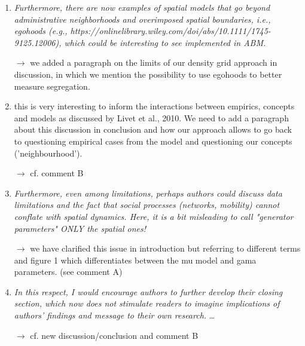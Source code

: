 \documentclass[11pt,a4paper,sans]{moderncv}        %
\begin{document}
\begin{enumerate}
  \medskip

  \item \textit{Furthermore, there are now examples of spatial models that go beyond administrative neighborhoods and overimposed spatial boundaries, i.e., egohoods (e.g., https://onlinelibrary.wiley.com/doi/abs/10.1111/1745-9125.12006), which could be interesting to see implemented in ABM.}
  
  $\rightarrow$ we added a paragraph on the limits of our density grid approach in discussion, in which we mention the possibility to use egohoods to better measure segregation.
  
  \medskip
  
   \item this is very interesting to inform the interactions between empirics, concepts and models as discussed by Livet et al., 2010. We need to add a paragraph about this discussion in conclusion and how our approach allows to go back to questioning empirical cases from the model and questioning our concepts ('neighbourhood'). 
   
   $\rightarrow$  cf. comment B

  \medskip

  \item\textit{Furthermore, even among limitations, perhaps authors could discuss data limitations and the fact that social processes (networks, mobility) cannot conflate with spatial dynamics. Here, it is a bit misleading to call "generator parameters" ONLY the spatial ones!}
  
  $\rightarrow$ we have clarified this issue in introduction but referring to different terms and figure 1 which differentiates between the mu model and gama parameters. (see comment A)
 
 \medskip
 
 
  \item\textit{In this respect, I would encourage authors to further develop their closing section, which now does not stimulate readers to imagine implications of authors' findings and message to their own research.} \ldots
  
  $\rightarrow$ cf. new discussion/conclusion and comment B


\end{enumerate}






\end{document}
